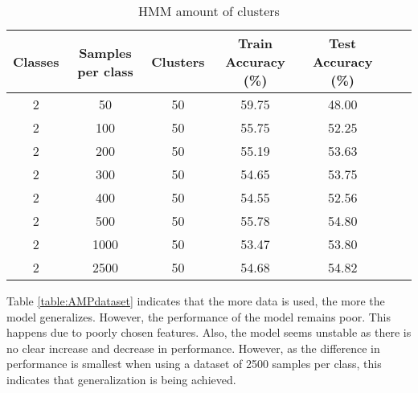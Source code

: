 \begin{table}[h!]
\begin{center}
\begin{tabular}{| c | c | c | c | c | c | c |}
\hline
 {\textbf{Classes}} 	 
 & {\textbf{Samples per class}} 					& {\textbf{Clusters}} 
 & {\textbf{Train Accuracy (\%)}} 					& {\textbf{Test Accuracy (\%)}} 
 \\
\hline
2 	 		& 50			& 50			& 	59.75	& 48.00		\\
2 	 		& 100 		& 50			& 	55.75	& 52.25		\\
2 	 		& 200 		& 50			& 	55.19	& 53.63		\\
2 	 		& 300 		& 50			& 	54.65	& 53.75		\\
2 	 		& 400 		& 50			& 	54.55	& 52.56		\\
2 	 		& 500 		& 50			& 	55.78	& 54.80		\\
2 	 		& 1000 		& 50			& 	53.47	& 53.80		\\
2 	 		& 2500 		& 50			& 	54.68	& 54.82		\\
\hline
\end{tabular}
\caption{HMM amount of clusters}
\label{table:HMMdataset}
\end{center}
\end{table}

Table \ref{table:AMPdataset} indicates that the more data is used, the more the model generalizes. However, the performance of the model remains poor. This happens due to poorly chosen features. Also, the model seems unstable as there is no clear increase and decrease in performance. However, as the difference in performance is smallest when using a dataset of 2500 samples per class, this indicates that generalization is being achieved.